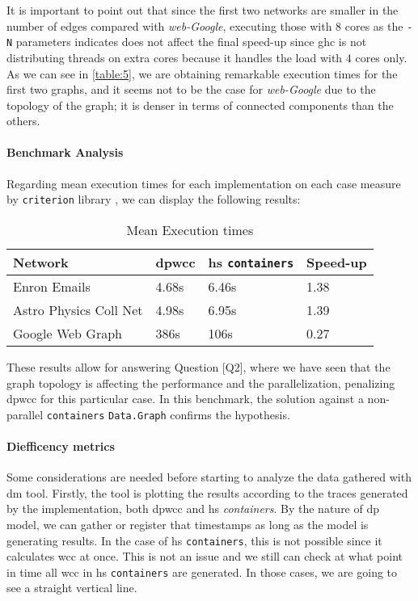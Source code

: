 It is important to point out that since the first two networks are smaller in the number of edges compared with \emph{web-Google}, 
executing those with $8$ cores as the \texttt{-N} parameters indicates does not affect the final speed-up since \acrshort{ghc} 
is not distributing threads on extra cores because it handles the load with $4$ cores only.
As we can see in \autoref{table:5}, we are obtaining remarkable execution times for the first two graphs, and it seems not to be the case 
for \textit{web-Google} due to the topology of the graph; it is denser in terms of connected components than the others.

\paragraph{Benchmark Analysis} Regarding mean execution times for each implementation on each case measure by \texttt{criterion} library \cite{criterion}, we can display the following results:

\begin{table}[H]
  \centering
  \begin{tabular}{|l|l|l|l|}
   \hline
   \textbf{Network} & \textbf{\acrshort{dpwcc}} & \textbf{\acrshort{hs} \texttt{containers}} & \textbf{Speed-up}\\
   \hline
   Enron Emails & 4.68s &  6.46s & 1.38\\
   \hline
   Astro Physics Coll Net & 4.98s & 6.95s  & 1.39\\
   \hline
   Google Web Graph & 386s & 106s & 0.27\\
   \hline
  \end{tabular}
 \caption{Mean Execution times}
 \label{table:6}
 \end{table}

These results allow for answering Question [Q2], where we have seen that the graph topology is affecting the performance and the parallelization, penalizing \acrshort{dpwcc} for this particular case. In this benchmark, 
the solution against a non-parallel \texttt{containers} \texttt{Data.Graph} confirms the hypothesis. 

\paragraph{Diefficency metrics} Some considerations are needed before starting to analyze the data gathered with \acrfull{dm} tool. Firstly, the tool is plotting the results according to the traces generated by the implementation, 
both \acrshort{dpwcc} and \acrshort{hs} \emph{containers}. By the nature of \acrshort{dp} model, we can gather or register that timestamps as long as the model is generating results. In the case of \acrshort{hs} \texttt{containers}, this is not possible since it 
calculates \acrshort{wcc} at once. This is not an issue and we still can check at what point in time all \acrshort{wcc} in \acrshort{hs} \texttt{containers} are generated. In those cases, we are going to see a straight vertical line. 

